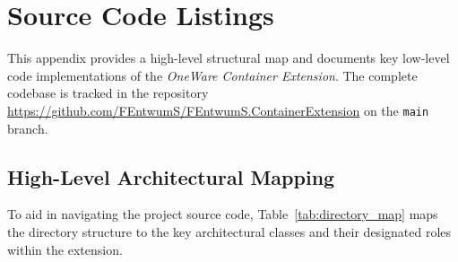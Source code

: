 % 
% 
% 

\chapter{Source Code Listings}
\label{app:code}

This appendix provides a high-level structural map and documents key low-level code implementations of the \textit{OneWare Container Extension}. The complete codebase is tracked in the repository \url{https://github.com/FEntwumS/FEntwumS.ContainerExtension} on the \texttt{main} branch.

\section{High-Level Architectural Mapping}
To aid in navigating the project source code, Table~\ref{tab:directory_map} maps the directory structure to the key architectural classes and their designated roles within the extension.

